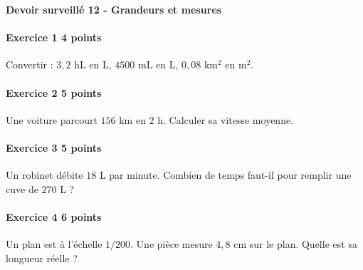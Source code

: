 \documentclass[a4paper,10pt]{article}
\newenvironment{exercice}[2]{\paragraph{Exercice #1 \hfill #2 points}\mbox{}\par}{\medskip}
\begin{document}
\begin{center}\Large\bfseries Devoir surveillé 12 - Grandeurs et mesures\end{center}
\vspace{2mm}
\begin{exercice}{1}{4}Convertir : $3,2$ hL en L, $4500$ mL en L, $0,08$ km$^2$ en m$^2$.\end{exercice}\begin{exercice}{2}{5}Une voiture parcourt $156$ km en $2$ h. Calculer sa vitesse moyenne.\end{exercice}\begin{exercice}{3}{5}Un robinet débite $18$ L par minute. Combien de temps faut-il pour remplir une cuve de $270$ L ?\end{exercice}\begin{exercice}{4}{6}Un plan est à l'échelle $1/200$. Une pièce mesure $4,8$ cm sur le plan. Quelle est sa longueur réelle ?\end{exercice}
\end{document}
